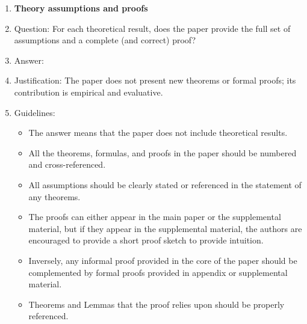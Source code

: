 \documentclass{article}
\begin{document}
\begin{enumerate}
\item {\bf Theory assumptions and proofs}
    \item[] Question: For each theoretical result, does the paper provide the full set of assumptions and a complete (and correct) proof?
    \item[] Answer: \answerNA{}
    \item[] Justification: The paper does not present new theorems or formal proofs; its contribution is empirical and evaluative.
    \item[] Guidelines:
    \begin{itemize}
        \item The answer \answerNA{} means that the paper does not include theoretical results.
        \item All the theorems, formulas, and proofs in the paper should be numbered and cross-referenced.
        \item All assumptions should be clearly stated or referenced in the statement of any theorems.
        \item The proofs can either appear in the main paper or the supplemental material, but if they appear in the supplemental material, the authors are encouraged to provide a short proof sketch to provide intuition.
        \item Inversely, any informal proof provided in the core of the paper should be complemented by formal proofs provided in appendix or supplemental material.
        \item Theorems and Lemmas that the proof relies upon should be properly referenced.
    \end{itemize}


\end{enumerate}
\end{document}
